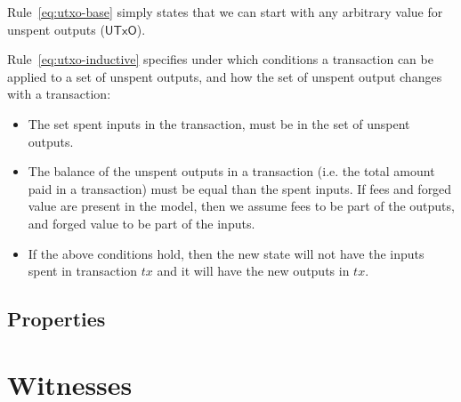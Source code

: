 \documentclass[11pt,a4paper]{article}
\newcommand{\var}[1]{\mathit{#1}}
\newcommand{\type}[1]{\mathsf{#1}}
\newcommand{\UTxO}{\type{UTxO}}
\begin{document}
Rule~\ref{eq:utxo-base} simply states that we can start with any arbitrary
value for unspent outputs ($\UTxO$).

Rule~\ref{eq:utxo-inductive} specifies under which conditions a transaction can
be applied to a set of unspent outputs, and how the set of unspent output changes
with a transaction:
\begin{itemize}
\item The set spent inputs in the transaction, must be in the set of unspent
  outputs.
\item The balance of the unspent outputs in a transaction (i.e. the total
  amount paid in a transaction) must be equal than the spent inputs. If fees
  and forged value are present in the model, then we assume fees to be part of
  the outputs, and forged value to be part of the inputs.
\item If the above conditions hold, then the new state will not have the inputs
  spent in transaction $\var{tx}$ and it will have the new outputs in
  $\var{tx}$.
\end{itemize}

\subsection{Properties}
\label{sec:utxo-properties}


\section{Witnesses}
\label{sec:witnesses}
\end{document}
